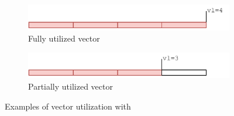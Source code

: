 \begin{figure}
    \centering
    \begin{subfigure}[b]{0.7\textwidth}
        \centering
        \includegraphics[width=\textwidth]{Figures/RVV_VL_full.pdf}
        \caption{Fully utilized vector}
        \label{fig:RVV_vl_full}
    \end{subfigure}
    \hfill
    \begin{subfigure}[b]{0.7\textwidth}
        \centering
        \includegraphics[width=\textwidth]{Figures/RVV_VL_short.pdf}
        \caption{Partially utilized vector}
        \label{fig:RVV_vl_short}
    \end{subfigure}
    \caption{Examples of vector utilization with }
    \label{fig:RVV_vl}
\end{figure}